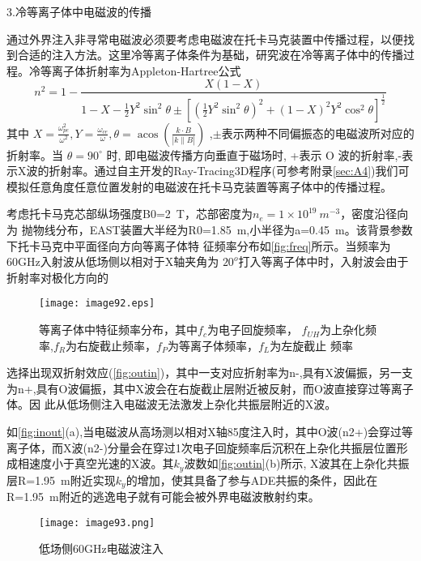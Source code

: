 \par \noindent
3.冷等离子体中电磁波的传播

通过外界注入非寻常电磁波必须要考虑电磁波在托卡马克装置中传播过程，以便找到合适的注入方法。这里冷等离子体条件为基础，研究波在冷等离子体中的传播过程。冷等离子体折射率为Appleton-Hartree公式
\begin{equation}
n^{2}=1-\frac{X(1-X)}{1-X-\frac{1}{2} Y^{2} \sin ^{2} \theta \pm\left[\left(\frac{1}{2} Y^{2} \sin ^{2} \theta\right)^{2}+(1-X)^{2} Y^{2} \cos ^{2} \theta\right]^{\frac{1}{2}}}
\end{equation}
其中  $X=\frac{\omega_{p e}^{2} }{\omega^{2}}, Y=\frac{\omega_{c e}}{\omega}, \theta=\operatorname{acos}\left(\frac{k \cdot B}{|k \| {B}|}\right)$ ,$\pm$表示两种不同偏振态的电磁波所对应的 折射率。当  $\theta=90^{\circ} $ 时, 即电磁波传播方向垂直于磁场时, +表示  O  波的折射率,-表示X波的折射率。通过自主开发的Ray-Tracing3D程序(可参考附录\autoref{sec:A4})我们可模拟任意角度任意位置发射的电磁波在托卡马克装置等离子体中的传播过程。

考虑托卡马克芯部纵场强度B0=2~T，芯部密度为$n_e=1×10^{19}~m^{-3}$，密度沿径向为
抛物线分布，EAST装置大半经为R0=1.85~m,小半径为a=0.45~m。该背景参数下托卡马克中平面径向方向等离子体特
征频率分布如\autoref{fig:freq}所示。当频率为60GHz入射波从低场侧以相对于X轴夹角为
$20^o$打入等离子体中时，入射波会由于折射率对极化方向的
\begin{figure}
\centering
\texttt{[image: image92.eps]}
\caption{\label{fig:freq}等离子体中特征频率分布，其中${f_c}$为电子回旋频率，
$f_{UH}$为上杂化频率,$f_{R}$为右旋截止频率，$f_P$为等离子体频率，$f_L$为左旋截止
频率}
\end{figure}
选择出现双折射效应(\autoref{fig:outin})，其中一支对应折射率为n-,具有X波偏振，另一支
为n+,具有O波偏振，其中X波会在右旋截止层附近被反射，而O波直接穿过等离子体。因
此从低场侧注入电磁波无法激发上杂化共振层附近的X波。

如\autoref{fig:inout}(a),当电磁波从高场测以相对X轴85度注入时，其中O波(n2+)会穿过等
离子体，而X波(n2-)分量会在穿过1次电子回旋频率后沉积在上杂化共振层位置形成相速度小于真空光速的X波。其$k_y$波数如\autoref{fig:outin}(b)所示, X波其在上杂化共振层R=1.95~m附近实现$k_y$的增加，使其具备了参与ADE共振的条件，因此在R=1.95~m附近的逃逸电子就有可能会被外界电磁波散射约束。


\begin{figure}[H]
\centering
\texttt{[image: image93.png]}
\caption{\label{fig:outin}低场侧60GHz电磁波注入}
\end{figure}

